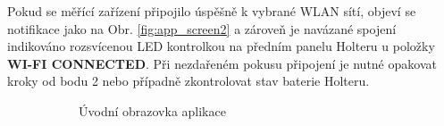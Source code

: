 Pokud se měřící zařízení připojilo úspěšně k vybrané WLAN sítí, objeví se
notifikace jako na Obr. \ref{fig:app_screen2} a zároveň je navázané spojení
indikováno rozsvícenou LED kontrolkou na předním panelu Holteru u položky
\textbf{WI-FI CONNECTED}. Při nezdařeném pokusu připojení je nutné opakovat
kroky od bodu 2 nebo případně zkontrolovat stav baterie Holteru.

\begin{figure}[h]
    \centering
    \begin{subfigure}[b]{0.45\textwidth}
        \centering
        \textcolor{cyan}{\fboxrule=2pt\fboxsep=0pt}
        \caption{Úvodní obrazovka aplikace}
        \label{fig:app_screen1}
    \end{subfigure}
    \hfill
    \begin{subfigure}[b]{0.45\textwidth}
        \centering

\end{subfigure}
\end{figure}
